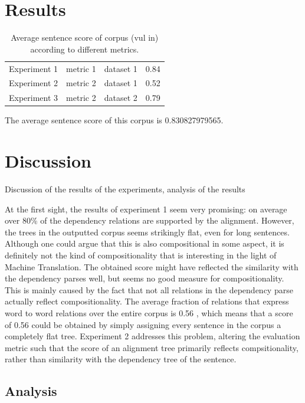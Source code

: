 \documentclass{report}
\theoremstyle{definition}
\theoremstyle{plain}
\begin{document}
\section{Results}

\begin{table}\label{table:scores}
\begin{tabular}{llll}
Experiment 1 & metric 1 & dataset 1 & 0.84\\
Experiment 2 & metric 2 & dataset 1 & 0.52\\
Experiment 3 & metric 2 & dataset 2 & 0.79\\
\end{tabular}
\caption{Average sentence score of corpus (vul in) according to different metrics.}
\end{table}


The average sentence score of this corpus is 0.830827979565.

\section{Discussion}

Discussion of the results of the experiments, analysis of the results

At the first sight, the results of experiment 1 seem very promising: on average over 80\% of the dependency relations are supported by the alignment. However, the trees in the outputted corpus seems strikingly flat, even for long sentences. Although one could argue that this is also compositional in some aspect, it is definitely not the kind of compositionality that is interesting in the light of Machine Translation. The obtained score might have reflected the similarity with the dependency parses well, but seems no good measure for compositionality. This is mainly caused by the fact that not all relations in the dependency parse actually reflect compositionality. The average fraction of relations that express word to word relations over the entire corpus is 0.56 %
, which means that a score of 0.56 could be obtained by simply assigning every sentence in the corpus a completely flat tree. Experiment 2 addresses this problem, altering the evaluation metric such that the score of an alignment tree primarily reflects compsitionality, rather than similarity with the dependency tree of the sentence.


\subsection{Analysis}
\end{document}

